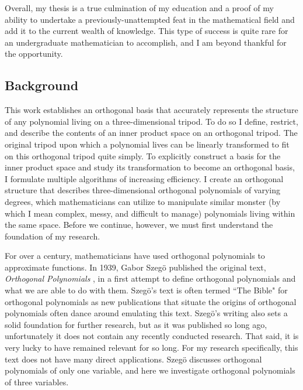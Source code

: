 \documentclass[letterpaper, 12pt]{article}
\begin{document}
Overall, my thesis is a true culmination of my education and a proof of my ability to undertake a previously-unattempted feat in the mathematical field and add it to the current wealth of knowledge. This type of success is quite rare for an undergraduate mathematician to accomplish, and I am beyond thankful for the opportunity. 







\newpage
\begin{centering}\section{Background}\end{centering}

This work establishes an orthogonal basis that accurately represents the structure of any polynomial living on a three-dimensional tripod. To do so I define, restrict, and describe the contents of an inner product space on an orthogonal tripod. The original tripod upon which a polynomial lives can be linearly transformed to fit on this orthogonal tripod quite simply. To explicitly construct a basis for the inner product space and study its transformation to become an orthogonal basis, I formulate multiple algorithms of increasing efficiency. I create an orthogonal structure that describes three-dimensional orthogonal polynomials of varying degrees, which mathematicians can utilize to manipulate similar monster (by which I mean complex, messy, and difficult to manage) polynomials living within the same space. Before we continue, however, we must first understand the foundation of my research.

For over a century, mathematicians have used orthogonal polynomials to approximate functions. In 1939, Gabor Szeg\"o published the original text, \textit{Orthogonal Polynomials} \cite{sze}, in a first attempt to define orthogonal polynomials and what we are able to do with them. Szeg\"o's text is often termed ``The Bible" for orthogonal polynomials as new publications that situate the origins of orthogonal polynomials often dance around emulating this text. Szeg\"o's writing also sets a solid foundation for further research, but as it was published so long ago, unfortunately it does not contain any recently conducted research. That said, it is very lucky to have remained relevant for so long. For my research specifically, this text does not have many direct applications. Szeg\"o discusses orthogonal polynomials of only one variable, and here we investigate orthogonal polynomials of three variables.
\end{document}

